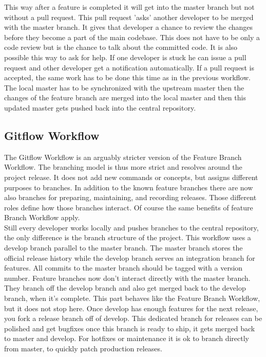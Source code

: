 This way after a feature is completed it will get into the master branch but not
without a pull request. This pull request 'asks' another developer to be merged
with the master branch. It gives that developer a chance to review the changes
before they become a part of the main codebase. This does not have to be only a
code review but is the chance to talk about the committed code. It is also
possible this way to ask for help. If one developer is stuck he can issue a pull
request and other developer get a notification automatically. If a pull
request is accepted, the same work has to be done this time as in the previous
workflow. The local master has to be synchronized with the upstream master then
the changes of the feature branch are merged into the local master and then this
updated master gets pushed back into the central repository.

\subsection{Gitflow Workflow}\label{sec:git-flow}

The Gitflow Workflow is an arguably stricter version of the Feature Branch
Workflow. The branching model is thus more strict and resolves around the
project release. It does not add new commands or concepts, but assigns different
purposes to branches. In addition to the known feature branches there are now
also branches for preparing, maintaining, and recording releases. Those
different roles define how those branches interact. Of course the same benefits
of feature Branch Workflow apply.\\

Still every developer works locally and pushes branches to the central
repository, the only difference is the branch structure of the project. This
workflow uses a develop branch parallel to the master branch. The master branch
stores the official release history while the develop branch serves an
integration branch for features. All commits to the master branch should be
tagged with a version number. Feature branches now don't interact directly with
the master branch. They branch off the develop branch and also get merged back
to the develop branch, when it's complete. This part behaves like the Feature
Branch Workflow, but it does not stop here. Once develop has enough features for
the next release, you fork a release branch off of develop. This dedicated
branch for releases can be polished and get bugfixes once this branch is ready
to ship, it gets merged back to master and develop. For hotfixes or maintenance
it is ok to branch directly from master, to quickly patch production releases.\\

